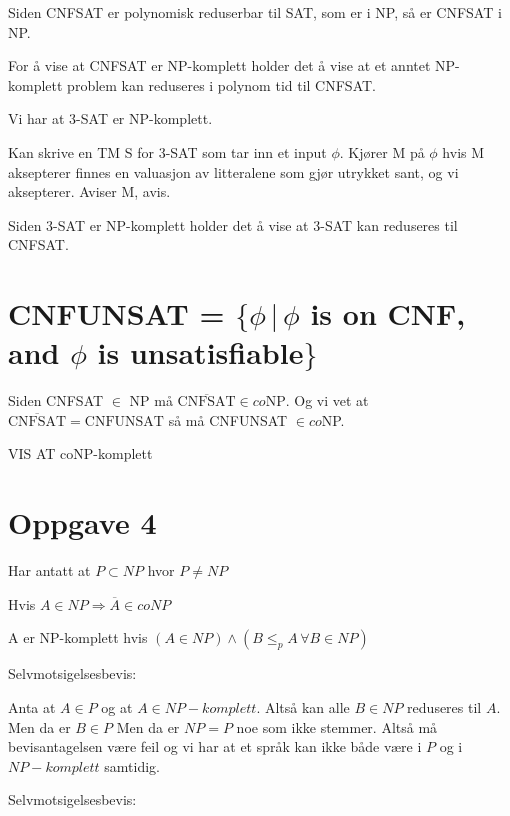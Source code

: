 \documentclass{article}
\begin{document}
Siden CNFSAT er polynomisk reduserbar til SAT, som er i NP, så er CNFSAT i NP.


For å vise at CNFSAT er NP-komplett holder det å vise at et anntet NP-komplett problem kan reduseres i polynom tid til CNFSAT.

Vi har at 3-SAT er NP-komplett.

Kan skrive en TM S for 3-SAT som tar inn et input $\phi$. Kjører M på $\phi$ hvis M aksepterer finnes en valuasjon av litteralene som gjør utrykket sant, og vi aksepterer. Aviser M, avis.

Siden 3-SAT er NP-komplett holder det å vise at 3-SAT kan reduseres til CNFSAT.


\section{CNFUNSAT = $\{\phi \, |  \, \phi $ is on CNF, and $\phi$ is unsatisfiable$\}$}

Siden CNFSAT $\in$ NP må $\overline{\text{CNFSAT}} \in co\text{NP}$.
Og vi vet at $\overline{\text{CNFSAT}} = \text{CNFUNSAT}$ så må CNFUNSAT $\in co$NP.

VIS AT coNP-komplett







\section{Oppgave 4}

Har antatt at $P \subset NP$ hvor $P \neq NP$

Hvis $A \in NP \Rightarrow \overline{A} \in coNP$

A er NP-komplett hvis $(A \in NP) \land (B \leq_p A \, \forall B \in NP)$


Selvmotsigelsesbevis:

Anta at $A \in P$ og at $A \in NP-komplett$. Altså kan alle $B \in NP$ reduseres til $A$. Men da er $B \in P$ Men da er $NP = P$ noe som ikke stemmer. Altså må bevisantagelsen være feil og vi har at et språk kan ikke både være i $P $ og i $NP-komplett$ samtidig.


Selvmotsigelsesbevis:
\end{document}
